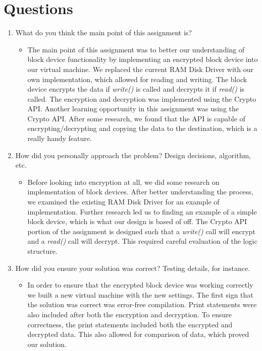 \documentclass[letterpaper,10pt,onecolumn]{IEEEtran}
\begin{document}
   
    \section*{Questions}
    \begin{enumerate}
        \item What do you think the main point of this assignment is?
        \begin{itemize}
            \item The main point of this assignment was to better our understanding of block device functionality by implementing an encrypted block device into our virtual machine. We replaced the current RAM Disk Driver with our own implementation, which allowed for reading and writing. The block device encrypts the data if \textit{write()} is called and decrypts it if \textit{read()} is called. The encryption and decryption was implemented using the Crypto API. Another learning opportunity in this assignment was using the Crypto API. After some research, we found that the API is capable of encrypting/decrypting and copying the data to the destination, which is a really handy feature.
        \end{itemize}
        \item How did you personally approach the problem? Design decisions, algorithm, etc.
        \begin{itemize}
            \item Before looking into encryption at all, we did some research on implementation of block devices. After better understanding the process, we examined the existing RAM Disk Driver for an example of implementation. Further research led us to finding an example of a simple block device, which is what our design is based of off. The Crypto API portion of the assignment is designed such that a \textit{write()} call will encrypt and a \textit{read()} call will decrypt. This required careful evaluation of the logic structure.
        \end{itemize}
        \item How did you ensure your solution was correct? Testing details, for instance.
        \begin{itemize}
            \item In order to ensure that the encrypted block device was working correctly we built a new virtual machine with the new settings. The first sign that the solution was correct was error-free compilation. Print statements were also included after both the encryption and decryption. To ensure correctness, the print statements included both the encrypted and decrypted data. This also allowed for comparison of data, which proved our solution.

\end{itemize}
\end{enumerate}
\end{document}
